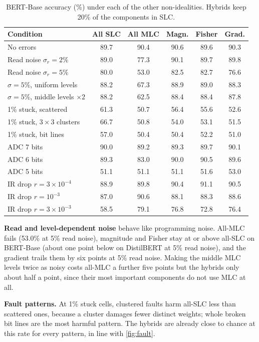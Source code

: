 \begin{table}[t]
\centering\footnotesize
\caption{BERT-Base accuracy (\%) under each of the other non-idealities. Hybrids keep 20\% of the components
in SLC.}\label{tab:chip}
\setlength{\tabcolsep}{2.4pt}
\begin{tabular}{@{}lccccc@{}}
\toprule
Condition & All SLC & All MLC & Magn. & Fisher & Grad. \\
\midrule
No errors & 89.7 & 90.4 & 90.6 & 89.6 & 90.3 \\
\midrule
Read noise $\sigma_r=2\%$ & 89.0 & 77.3 & 90.1 & 89.7 & 89.8 \\
Read noise $\sigma_r=5\%$ & 80.0 & 53.0 & 82.5 & 82.7 & 76.6 \\
$\sigma=5\%$, uniform levels & 88.2 & 67.3 & 88.9 & 89.0 & 88.3 \\
$\sigma=5\%$, middle levels $\times2$ & 88.2 & 62.5 & 88.4 & 88.4 & 87.8 \\
\midrule
1\% stuck, scattered & 61.3 & 50.7 & 56.4 & 55.6 & 52.6 \\
1\% stuck, $3\times3$ clusters & 66.7 & 50.8 & 54.0 & 53.1 & 51.5 \\
1\% stuck, bit lines & 57.0 & 50.4 & 50.4 & 52.2 & 51.0 \\
\midrule
ADC 7 bits & 90.0 & 89.2 & 89.3 & 89.7 & 90.1 \\
ADC 6 bits & 89.3 & 83.0 & 90.0 & 90.5 & 89.6 \\
ADC 5 bits & 51.1 & 51.1 & 51.1 & 51.6 & 53.0 \\
\midrule
IR drop $r=3\times10^{-4}$ & 88.9 & 89.8 & 90.4 & 91.1 & 90.5 \\
IR drop $r=10^{-3}$ & 87.0 & 90.6 & 88.1 & 88.3 & 88.6 \\
IR drop $r=3\times10^{-3}$ & 58.5 & 79.1 & 76.8 & 72.8 & 76.4 \\
\bottomrule
\end{tabular}
\end{table}

\textbf{Read and level-dependent noise} behave like programming noise. All-MLC fails (53.0\% at 5\% read
noise), magnitude and Fisher stay at or above all-SLC on BERT-Base (about one point below on DistilBERT at
5\% read noise), and the gradient trails them by six points at 5\% read noise.
Making the middle MLC levels twice as noisy costs all-MLC a further five points but the hybrids only about
half a point, since their most important components do not use MLC at all.

\textbf{Fault patterns.} At 1\% stuck cells, clustered faults harm all-SLC less than scattered ones,
because a cluster damages fewer distinct weights; whole broken bit lines are the most harmful pattern.
The hybrids are already close to chance at this rate for every pattern, in line with \cref{fig:fault}.

